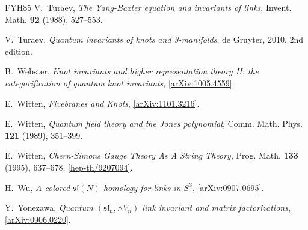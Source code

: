 \documentclass{compositio}
\theoremstyle{definition}
\numberwithin{equation}{section}
\begin{document}
\begin{thebibliography}{FYH{\etalchar{+}}85}
V.~Turaev, \emph{The {Y}ang-{B}axter equation and invariants of links}, Invent.
  Math. \textbf{92} (1988), 527--553.

V.~Turaev, \emph{Quantum invariants of knots and 3-manifolds}, de Gruyter, 2010,
  2nd edition.

B.~Webster, \emph{Knot invariants and higher representation theory {II}: the
  categorification of quantum knot invariants},
  \href{http://arxiv.org/abs/1005.4559}{[arXiv:1005.4559]}.

E.~Witten, \emph{Fivebranes and {K}nots},
  \href{http://arxiv.org/abs/1101.3216}{[arXiv:1101.3216]}.

E.~Witten, \emph{Quantum field theory and the {J}ones polynomial}, Comm. Math.
  Phys. \textbf{121} (1989), 351--399.

E.~Witten, \emph{Chern-{S}imons {G}auge {T}heory {A}s {A} {S}tring {T}heory},
  Prog. Math. \textbf{133} (1995), 637--678,
  \href{http://arxiv.org/abs/hep-th/9207094}{[hep-th/9207094]}.

H.~Wu, \emph{A colored {$\mathfrak{sl}(N)$}-homology for links in {$S^3$}},
  \href{http://arxiv.org/abs/0907.0695}{[arXiv:0907.0695]}.

Y.~Yonezawa, \emph{Quantum {$(\mathfrak{sl}_n, \wedge V_n)$} link invariant and
  matrix factorizations},
  \href{http://arxiv.org/abs/0906.0220}{[arXiv:0906.0220]}.

\end{thebibliography}
\end{document}
